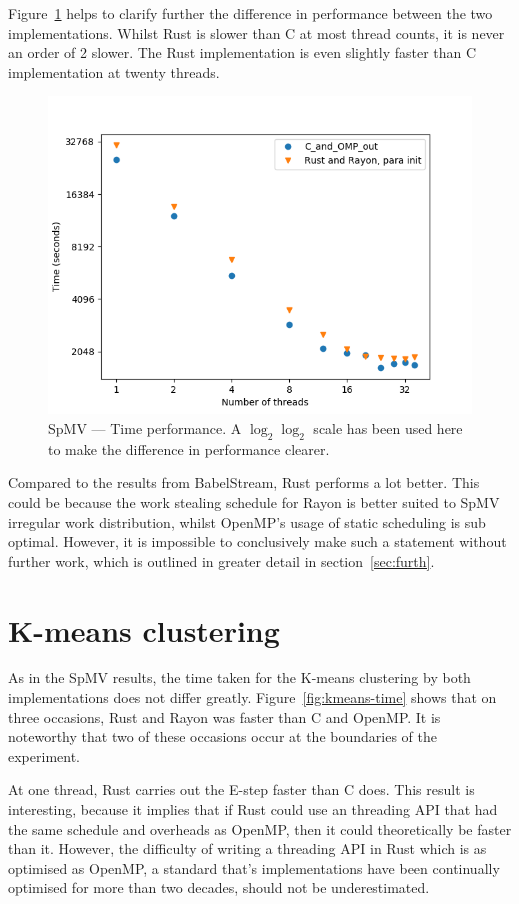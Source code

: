 Figure~\ref{fig:sparse-time} helps to clarify further the difference in performance between  the two implementations.  Whilst Rust is slower than C at most thread counts, it is never an order of 2 slower.
The Rust implementation is even slightly faster than C implementation at twenty threads. 
\begin{figure}[h]
\centering
\includegraphics[width=.9\linewidth]{figs/sparse/time.png}
\caption{SpMV --- Time performance. A $\log_2 \log_2$ scale has been used here to make the difference in performance clearer.}\label{fig:sparse-time}
\end{figure}

Compared to the results from BabelStream, Rust performs a lot better. This could be because the work stealing schedule for Rayon is better suited to SpMV irregular work distribution, whilst OpenMP's usage of static scheduling is sub optimal. However, it is impossible to conclusively make such a statement without further work, which is outlined in greater detail in section~\ref{sec:furth}.


\section{K-means clustering}

As in the SpMV results, the time taken for the K-means clustering by both implementations does not differ greatly. Figure~\ref{fig:kmeans-time} shows that on three occasions, Rust and Rayon was faster than C and OpenMP. It is noteworthy that two of these occasions occur at the boundaries of the experiment.

At one thread, Rust carries out the E-step faster than C does. This result is interesting, because it implies that if Rust could use an threading API that had the same schedule and overheads as OpenMP, then it could theoretically be faster than it. However, the difficulty of writing a threading API in Rust which is as optimised as OpenMP, a standard that's implementations have been continually optimised for more than two decades, should not be underestimated.


